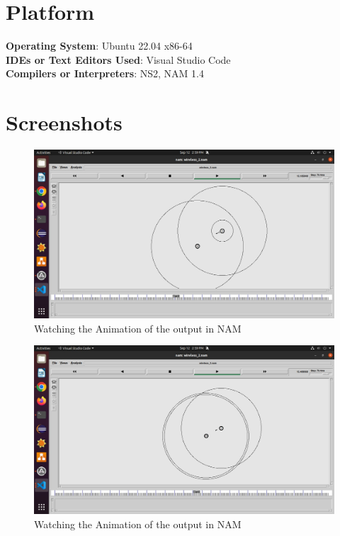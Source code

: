 \documentclass[11pt]{article}
\begin{document}
\section{Platform}
\textbf{Operating System}: Ubuntu 22.04 x86-64 \\
\textbf{IDEs or Text Editors Used}: Visual Studio Code\\
\textbf{Compilers or Interpreters}: NS2, NAM 1.4\\

\section{Screenshots}

\begin{figure}[H]
    \centering
    \includegraphics[width=.95\textwidth]{../../Programs/Assignment 2/Screenshots/1.jpeg}
    \caption{Watching the Animation of the output in NAM}
\end{figure}

\begin{figure}[H]
    \centering
    \includegraphics[width=.95\textwidth]{../../Programs/Assignment 2/Screenshots/2.jpeg}
    \caption{Watching the Animation of the output in NAM}
\end{figure}
\end{document}
